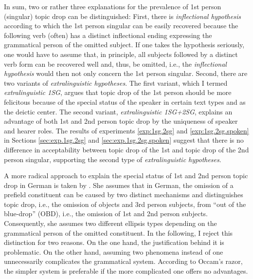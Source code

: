 In sum, two or rather three explanations for the prevalence of 1st person (singular) topic drop can be distinguished:
First, there is  \textit{inflectional hypothesis} according to which the 1st person singular can be easily recovered   because the following verb (often) has a distinct inflectional ending expressing the grammatical person of the omitted subject.
If one takes the hypothesis seriously, one would have to assume that, in principle, all subjects followed by a distinct verb form can be recovered  well and, thus, be omitted, i.e., the \textit{inflectional hypothesis} would then not only concern the 1st person singular.
Second, there are two variants of \textit{extralinguistic hypotheses}.
The first variant, which I termed \textit{extralinguistic 1SG}, argues that topic drop of the 1st person should be more felicitous because of the special status of the speaker in certain text types  and as the deictic center.
The second variant, \textit{extralinguistic 1SG+2SG}, explains an advantage of both 1st and 2nd person topic drop by the uniqueness of speaker and hearer roles.
The results of experiments \ref*{exp:1sg.2sg} and \ref*{exp:1sg.2sg.spoken} in Sections \ref{sec:exp.1sg.2sg} and \ref{sec:exp.1sg.2sg.spoken} suggest that there is no difference in acceptability between topic drop of the 1st and topic drop of the 2nd person singular, supporting the second type of \textit{extralinguistic hypotheses}.

A more radical approach to explain the special status of 1st and 2nd person topic drop in German is taken by \citet{trutkowski2011,trutkowski2016}.
She assumes that in German, the omission of a prefield constituent can be caused by two distinct mechanisms and distinguishes topic drop, i.e., the omission of objects and 3rd person subjects, from ``out of the blue-drop'' (OBD), i.e., the omission of 1st and 2nd person subjects.
Consequently, she assumes two different ellipsis types depending on the grammatical person of the omitted constituent.
In the following, I reject this distinction for two reasons.
On the one hand, the justification behind it is problematic.
On the other hand, assuming two phenomena instead of one unnecessarily complicates the grammatical system.
According to Occam's razor, the simpler system is preferable if the more complicated one offers no advantages.

